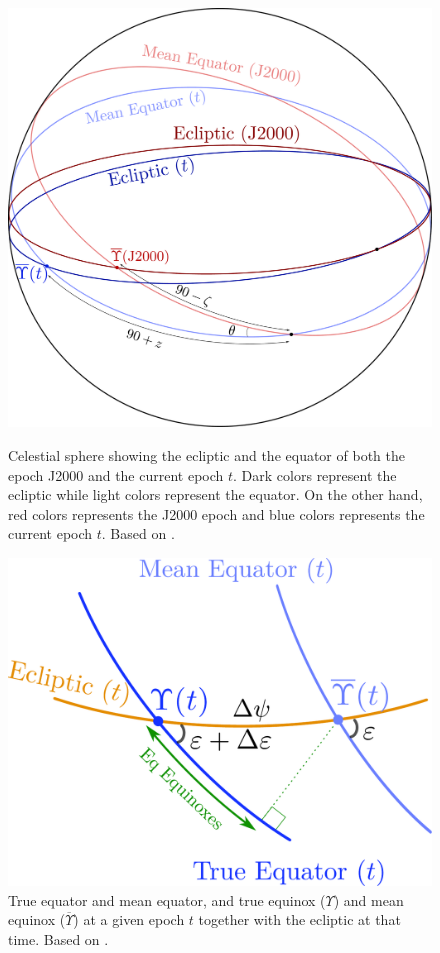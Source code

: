 \documentclass[../main.tex]{subfiles}
\begin{document}
\begin{figure}[htbp]
  \centering
  \begin{minipage}[ht]{0.45\textwidth}
    \centering
    \includegraphics[width=\textwidth]{Images/ecliptic_equator.pdf}
    \caption{Celestial sphere showing the ecliptic and the equator of both the epoch J2000 and the current epoch $t$. Dark colors represent the ecliptic while light colors represent the equator. On the other hand, red colors represents the J2000 epoch and blue colors represents the current epoch $t$. Based on \cite{montenbruck}.}
    \label{fig:precession_matrix}
  \end{minipage}
  \hspace{0.0333333\textwidth}
  \begin{minipage}[ht]{0.45\textwidth}
    \centering
    \includegraphics[width=\textwidth]{Images/nutation_matrix.pdf}
    \caption{True equator and mean equator, and true equinox ($\Upsilon$) and mean equinox ($\overline\Upsilon$) at a given epoch $t$ together with the ecliptic at that time. Based on \cite{montenbruck}.}
    \label{fig:nutation_matrix}
  \end{minipage}
\end{figure}
\end{document}
